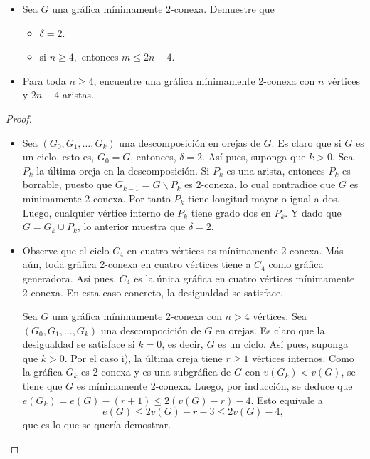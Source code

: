 \documentclass[12pt]{article}
\newenvironment{problem}[2][Problema]{\begin{trivlist}
\item[\hskip \labelsep {\bfseries #1}\hskip \labelsep {\bfseries #2.}]}{\end{trivlist}}
\begin{document}
\begin{problem}{9.1.7} \text{} \begin{itemize}
    \item[a)] Sea $G$ una gráfica mínimamente 2-conexa. Demuestre que \begin{itemize}
        \item[i)] $\delta = 2$.
        \item[ii)] si $n \geq 4,$ entonces $m \leq 2n-4$.
    \end{itemize}
    \item[b)] Para toda $n \geq 4$, encuentre una gráfica mínimamente 2-conexa con $n$ vértices y $2n-4$ aristas.
\end{itemize}
\end{problem}
\begin{proof}\textbf{}
\begin{itemize}
    \item[a), i)] Sea $(G_0, G_1, \ldots, G_k)$ una descomposición en orejas de $G.$ Es claro que si $G$ es un ciclo, esto es, $G_0 = G$, entonces, $\delta = 2$. Así pues, suponga que $k > 0.$ Sea $P_k$ la última oreja en la descomposición. Si $P_k$ es una arista, entonces $P_k$ es borrable, puesto que $G_{k-1} = G \backslash P_k$ es 2-conexa, lo cual contradice que $G$ es mínimamente 2-conexa. Por tanto $P_k$ tiene longitud mayor o igual a dos. Luego, cualquier vértice interno de $P_k$ tiene grado dos en $P_k$. Y dado que $G = G_k \cup P_k$, lo anterior muestra que $\delta = 2.$
    
    \item[a), ii)]
    Observe que el ciclo $C_4$ en cuatro vértices es mínimamente 2-conexa. Más aún, toda gráfica 2-conexa en cuatro vértices tiene a $C_4$ como gráfica generadora. Así pues, $C_4$ es la única gráfica en cuatro vértices mínimamente 2-conexa. En esta caso concreto, la desigualdad se satisface.  
    
    Sea $G$ una gráfica mínimamente 2-conexa con $n > 4$ vértices. Sea $(G_0, G_1, \ldots, G_k)$ una descompocición de $G$ en orejas. Es claro que la desigualdad se satisface si $k=0$, es decir, $G$ es un ciclo. Así pues, suponga que $k > 0$. Por el caso i), la última oreja tiene $r \geq 1$ vértices internos. Como la gráfica $G_k$ es 2-conexa y es una subgráfica de $G$ con $v(G_k) < v(G)$, se tiene que $G$ es mínimamente 2-conexa. Luego, por inducción,  se deduce que $e(G_k) = e(G) - (r + 1) \leq 2(v(G) - r) - 4.$ Esto equivale a
    $$e(G) \leq 2v(G) - r - 3 \leq 2v(G) - 4,$$
    que es lo que se quería demostrar.
    

\end{itemize}
\end{proof}
\end{document}
